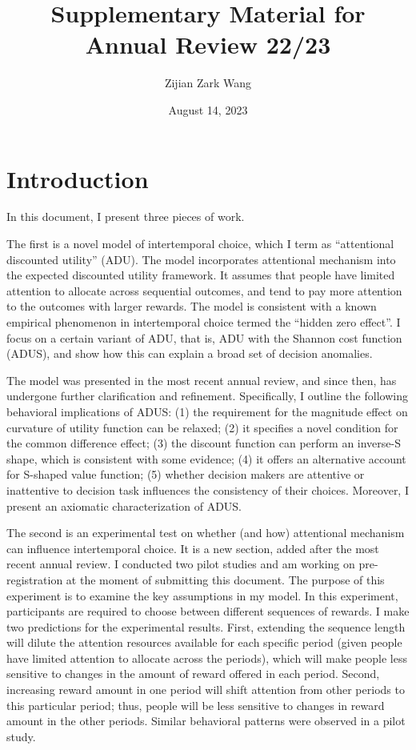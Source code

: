 \documentclass[
  12pt,
]{article}
\title{Supplementary Material for Annual Review 22/23}
\author{Zijian Zark Wang}
\date{August 14, 2023}
\begin{document}
\maketitle

\hypertarget{introduction}{%
\section{Introduction}\label{introduction}}

In this document, I present three pieces of work.

The first is a novel model of intertemporal choice, which I term as
``attentional discounted utility'' (ADU). The model incorporates
attentional mechanism into the expected discounted utility framework. It
assumes that people have limited attention to allocate across sequential
outcomes, and tend to pay more attention to the outcomes with larger
rewards. The model is consistent with a known empirical phenomenon in
intertemporal choice termed the ``hidden zero effect''. I focus on a
certain variant of ADU, that is, ADU with the Shannon cost function
(ADUS), and show how this can explain a broad set of decision anomalies.

The model was presented in the most recent annual review, and since
then, has undergone further clarification and refinement. Specifically,
I outline the following behavioral implications of ADUS: (1) the
requirement for the magnitude effect on curvature of utility function
can be relaxed; (2) it specifies a novel condition for the common
difference effect; (3) the discount function can perform an inverse-S
shape, which is consistent with some evidence; (4) it offers an
alternative account for S-shaped value function; (5) whether decision
makers are attentive or inattentive to decision task influences the
consistency of their choices. Moreover, I present an axiomatic
characterization of ADUS.

The second is an experimental test on whether (and how) attentional
mechanism can influence intertemporal choice. It is a new section, added
after the most recent annual review. I conducted two pilot studies and
am working on pre-registration at the moment of submitting this
document. The purpose of this experiment is to examine the key
assumptions in my model. In this experiment, participants are required
to choose between different sequences of rewards. I make two predictions
for the experimental results. First, extending the sequence length will
dilute the attention resources available for each specific period (given
people have limited attention to allocate across the periods), which
will make people less sensitive to changes in the amount of reward
offered in each period. Second, increasing reward amount in one period
will shift attention from other periods to this particular period; thus,
people will be less sensitive to changes in reward amount in the other
periods. Similar behavioral patterns were observed in a pilot study.
\end{document}
